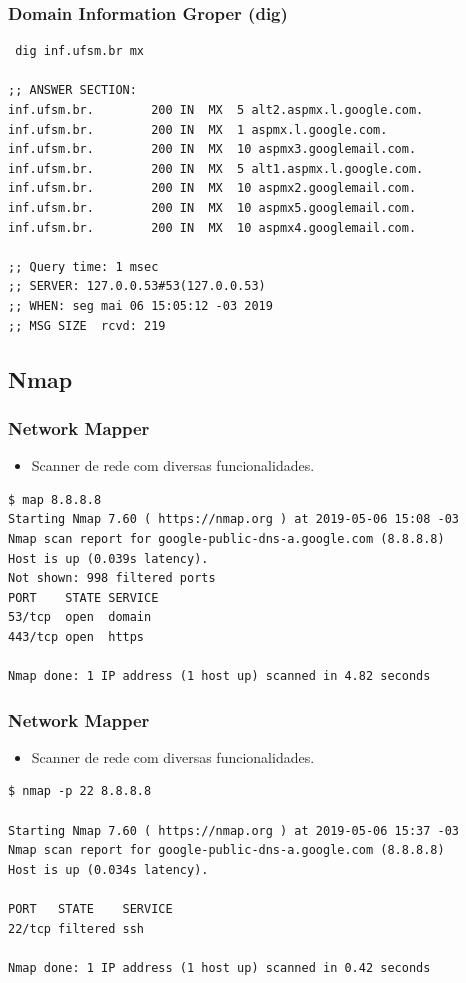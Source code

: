 \documentclass[xcolor=dvipsnames,10pt,compress,aspectratio=169]{beamer}
\begin{document}
\begin{frame}[fragile]
	\frametitle{Domain Information Groper (dig)}
\begin{small}
\begin{verbatim}
 dig inf.ufsm.br mx

;; ANSWER SECTION:
inf.ufsm.br.		200	IN	MX	5 alt2.aspmx.l.google.com.
inf.ufsm.br.		200	IN	MX	1 aspmx.l.google.com.
inf.ufsm.br.		200	IN	MX	10 aspmx3.googlemail.com.
inf.ufsm.br.		200	IN	MX	5 alt1.aspmx.l.google.com.
inf.ufsm.br.		200	IN	MX	10 aspmx2.googlemail.com.
inf.ufsm.br.		200	IN	MX	10 aspmx5.googlemail.com.
inf.ufsm.br.		200	IN	MX	10 aspmx4.googlemail.com.

;; Query time: 1 msec
;; SERVER: 127.0.0.53#53(127.0.0.53)
;; WHEN: seg mai 06 15:05:12 -03 2019
;; MSG SIZE  rcvd: 219
\end{verbatim}
\end{small}
\end{frame}
\subsection{Nmap}
\begin{frame}[fragile]
	\frametitle{Network Mapper}
	\begin{itemize}
	\item Scanner de rede com diversas funcionalidades.
	\end{itemize}
\begin{small}
\begin{verbatim}
$ map 8.8.8.8
Starting Nmap 7.60 ( https://nmap.org ) at 2019-05-06 15:08 -03
Nmap scan report for google-public-dns-a.google.com (8.8.8.8)
Host is up (0.039s latency).
Not shown: 998 filtered ports
PORT    STATE SERVICE
53/tcp  open  domain
443/tcp open  https

Nmap done: 1 IP address (1 host up) scanned in 4.82 seconds
\end{verbatim}
\end{small}
\end{frame}
\begin{frame}[fragile]
	\frametitle{Network Mapper}
	\begin{itemize}
	\item Scanner de rede com diversas funcionalidades.
	\end{itemize}
\begin{small}
\begin{verbatim}
$ nmap -p 22 8.8.8.8

Starting Nmap 7.60 ( https://nmap.org ) at 2019-05-06 15:37 -03
Nmap scan report for google-public-dns-a.google.com (8.8.8.8)
Host is up (0.034s latency).

PORT   STATE    SERVICE
22/tcp filtered ssh

Nmap done: 1 IP address (1 host up) scanned in 0.42 seconds
\end{verbatim}
\end{small}
\end{frame}
\end{document}
